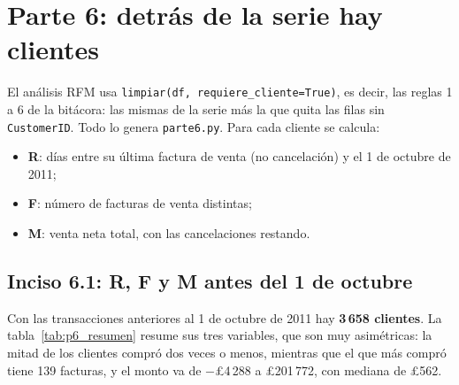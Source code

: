 \section{Parte 6: detrás de la serie hay clientes}
\label{sec:parte6}

El análisis RFM usa \texttt{limpiar(df, requiere\_cliente=True)}, es decir,
las reglas 1 a 6 de la bitácora: las mismas de la serie más la que quita las
filas sin \texttt{CustomerID}. Todo lo genera \texttt{parte6.py}. Para cada
cliente se calcula:
\begin{itemize}
  \item \textbf{R}: días entre su última factura de venta (no cancelación) y
    el 1 de octubre de 2011;
  \item \textbf{F}: número de facturas de venta distintas;
  \item \textbf{M}: venta neta total, con las cancelaciones restando.
\end{itemize}

\subsection{Inciso 6.1: R, F y M antes del 1 de octubre}

Con las transacciones anteriores al 1 de octubre de 2011 hay \textbf{3\,658
clientes}. La tabla~\ref{tab:p6_resumen} resume sus tres variables, que son
muy asimétricas: la mitad de los clientes compró dos veces o menos, mientras
que el que más compró tiene 139 facturas, y el monto va de $-$\pounds4\,288 a
\pounds201\,772, con mediana de \pounds562.

\begin{table}[H]
  \centering
  \small
  \caption{Distribución de R, F y M para los 3\,658 clientes con transacciones
  antes del 1 de octubre de 2011. P20, P40, P60 y P80 son los cortes de los
  quintiles.}
  \label{tab:p6_resumen}
\end{table}

